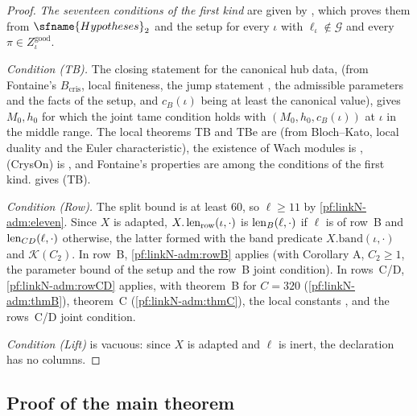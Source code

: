 \begin{proof}
\emph{The seventeen conditions of the first kind} are given by
, which proves them from $\sfname{Hypotheses}_2$ and the setup for
every $\iota$ with $\ell_\iota\notin\mathcal G$ and every $\pi\in Z^{\mathrm{good}}_\iota$.

\emph{Condition (TB).} The closing statement for the canonical hub data,
 (from Fontaine's $B_{\mathrm{cris}}$, local finiteness, the jump statement
, the admissible parameters and the facts of the setup, and
$c_B(\iota)$ being at least the canonical value), gives $M_0,h_0$ for which the joint tame condition holds with
$(M_0,h_0,c_B(\iota))$ at $\iota$ in the middle range. The local theorems TB and TBe are
 (from Bloch--Kato, local duality and the Euler
characteristic), the existence of Wach modules is ,
(CrysOn) is , and Fontaine's properties are among the conditions of
the first kind.  gives (TB).

\emph{Condition (Row).} The split bound is at least $60$, so $\ell\ge11$ by \cref{pf:linkN-adm:eleven}. Since $X$ is
adapted, $X.\operatorname{len}_{\mathrm{row}}(\iota,\cdot)$ is $\operatorname{len}_B(\ell,\cdot)$ if $\ell$ is of row~B and
$\operatorname{len}_{CD}(\ell,\cdot)$ otherwise, the latter formed with the band predicate $X.\mathrm{band}(\iota,\cdot)$ and
$\mathcal K(C_2)$. In row~B, \cref{pf:linkN-adm:rowB} applies (with Corollary A, $C_2\ge1$, the parameter bound of the
setup and the row~B joint condition). In rows~C/D, \cref{pf:linkN-adm:rowCD} applies, with theorem~B for $C=320$
(\cref{pf:linkN-adm:thmB}), theorem~C (\cref{pf:linkN-adm:thmC}), the local constants
, and the rows~C/D joint condition.

\emph{Condition (Lift)} is vacuous: since $X$ is adapted and $\ell$ is inert, the declaration has no columns.
\end{proof}

\subsection{Proof of the main theorem}\label{pf:linkN-adm:proofmain}

